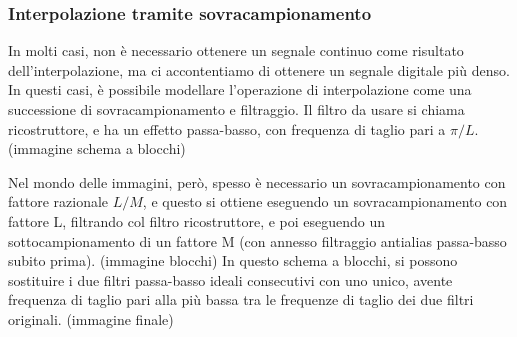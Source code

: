 \documentclass[a4paper,11pt]{article}
\begin{document}
\subsubsection{Interpolazione tramite sovracampionamento}
In molti casi, non è necessario ottenere un segnale continuo come risultato dell'interpolazione, ma ci accontentiamo di ottenere un segnale digitale più denso.
In questi casi, è possibile modellare l'operazione di interpolazione come una successione di sovracampionamento e filtraggio. Il filtro da usare si chiama
ricostruttore, e ha un effetto passa-basso, con frequenza di taglio pari a $\pi/L$.
(immagine schema a blocchi)
\par
Nel mondo delle immagini, però, spesso è necessario un sovracampionamento con fattore razionale $L/M$, e questo si ottiene eseguendo un sovracampionamento con fattore L,
filtrando col filtro ricostruttore, e poi eseguendo un sottocampionamento di un fattore M (con annesso filtraggio antialias passa-basso subito prima). (immagine blocchi)
In questo schema a blocchi, si possono sostituire i due filtri passa-basso ideali consecutivi con uno unico, avente frequenza di taglio pari alla più bassa tra le frequenze di taglio
dei due filtri originali. (immagine finale)
\end{document}
